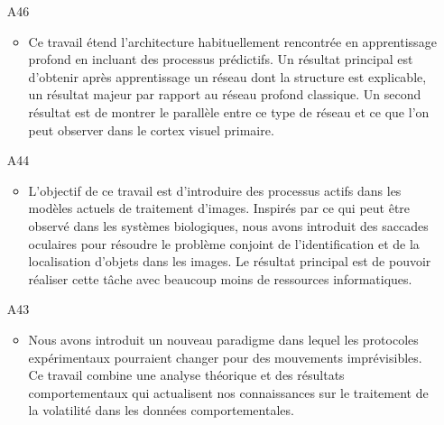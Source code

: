 \begin{enumerate}
\item[A46] %
\begin{itemize}
  \item Ce travail étend l'architecture habituellement rencontrée en apprentissage profond en incluant des processus prédictifs. Un résultat principal est d'obtenir après apprentissage un réseau dont la structure est explicable, un résultat majeur par rapport au réseau profond classique. Un second résultat est de montrer le parallèle entre ce type de réseau et ce que l'on peut observer dans le cortex visuel primaire.
\end{itemize}
%

\item[A44]  %
\begin{itemize}
  \item L'objectif de ce travail est d'introduire des processus actifs dans les modèles actuels de traitement d'images. Inspirés par ce qui peut être observé dans les systèmes biologiques, nous avons introduit des saccades oculaires pour résoudre le problème conjoint de l'identification et de la localisation d'objets dans les images. Le résultat principal est de pouvoir réaliser cette tâche avec beaucoup moins de ressources informatiques.
\end{itemize}

\item[A43] %
\begin{itemize}
  \item Nous avons introduit un nouveau paradigme dans lequel les protocoles expérimentaux pourraient changer pour des mouvements imprévisibles. Ce travail combine une analyse théorique et des résultats comportementaux qui actualisent nos connaissances sur le traitement de la volatilité dans les données comportementales.
\end{itemize}

%
%
%
%


\end{enumerate}
